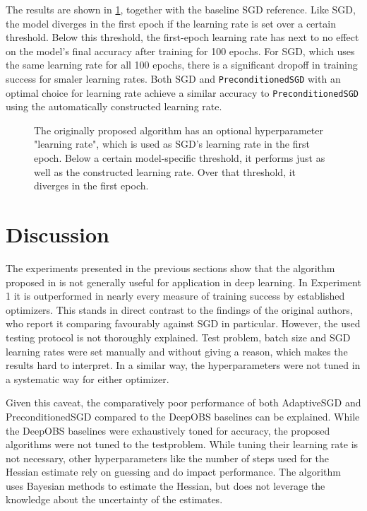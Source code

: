 \documentclass[twoside,12pt,a4paper]{report}
\begin{document}
The results are shown in \ref{fig:exp_lr_sens}, together with the baseline SGD reference.
Like SGD, the model diverges in the first epoch if the learning rate is set over a certain threshold. Below this threshold, the first-epoch learning rate has next to no effect on the model's final accuracy after training for 100 epochs. For SGD, which uses the same learning rate for all 100 epochs, there is a significant dropoff in training success for smaler learning rates.
Both SGD and \verb|PreconditionedSGD| with an optimal choice for learning rate achieve a similar accuracy to \verb|PreconditionedSGD| using the automatically constructed learning rate. 

\begin{figure}
	\centering \hspace{-1,5cm}
	
	\caption{The originally proposed algorithm has an optional hyperparameter "learning rate", which is used as SGD's learning rate in the first epoch. Below a certain model-specific threshold, it performs just as well as the constructed learning rate. Over that threshold, it diverges in the first epoch. }
	\label{fig:exp_lr_sens}
\end{figure}



\section{Discussion}
The experiments presented in the previous sections show that the algorithm proposed in \cite{roos2019active} is not generally useful for application in deep learning. In Experiment 1 it is outperformed in nearly every measure of training success by established optimizers. This stands in direct contrast to the findings of the original authors, who report it comparing favourably against SGD in particular. However, the used testing protocol is not thoroughly explained. Test problem, batch size and SGD learning rates were set manually and without giving a reason, which makes the results hard to interpret. In a similar way, the hyperparameters were not tuned in a systematic way for either optimizer.

Given this caveat, the comparatively poor performance of both AdaptiveSGD and PreconditionedSGD compared to the DeepOBS baselines can be explained. While the DeepOBS baselines were exhaustively toned for accuracy, the proposed algorithms were not tuned to the testproblem. While tuning their learning rate is not necessary, other hyperparameters like the number of steps used for the Hessian estimate rely on guessing and do impact performance. The algorithm uses Bayesian methods to estimate the Hessian, but does not leverage the knowledge about the uncertainty of the estimates.
\end{document}
